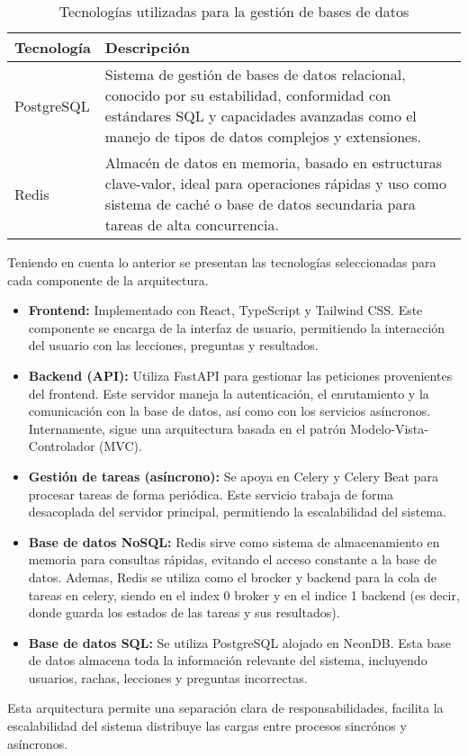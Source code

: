 \begin{table}[H]
\centering
\begin{tabular}{|p{3cm}|p{9cm}|}
\hline
\textbf{Tecnología} & \textbf{Descripción} \\
\hline
PostgreSQL & Sistema de gestión de bases de datos relacional, conocido por su estabilidad, conformidad con estándares SQL y capacidades avanzadas como el manejo de tipos de datos complejos y extensiones. \\
\hline
Redis & Almacén de datos en memoria, basado en estructuras clave-valor, ideal para operaciones rápidas y uso como sistema de caché o base de datos secundaria para tareas de alta concurrencia. \\
\hline
\end{tabular}
\caption{Tecnologías utilizadas para la gestión de bases de datos}
\end{table}


Teniendo en cuenta lo anterior se presentan las tecnologías seleccionadas para cada componente de la arquitectura.


\begin{itemize}
    \item \textbf{Frontend:} Implementado con React, TypeScript y Tailwind CSS. Este componente se encarga de la interfaz de usuario, permitiendo la interacci\'on del usuario con las lecciones, preguntas y resultados.
    
    \item \textbf{Backend (API):} Utiliza FastAPI para gestionar las peticiones provenientes del frontend. Este servidor maneja la autenticación, el enrutamiento y la comunicación con la base de datos, así como con los servicios asíncronos. Internamente, sigue una arquitectura basada en el patrón Modelo-Vista-Controlador (MVC).
    
    \item \textbf{Gestión de tareas (as\'incrono):} Se apoya en Celery y Celery Beat para procesar tareas de forma peri\'odica. Este servicio trabaja de forma desacoplada del servidor principal, permitiendo la escalabilidad del sistema.

    \item \textbf{Base de datos NoSQL:} Redis sirve como sistema de almacenamiento en memoria para consultas r\'apidas, evitando el acceso constante a la base de datos. Ademas, Redis se utiliza como el brocker y backend para la cola de tareas en celery, siendo en el index 0 broker y en el indice 1 backend (es decir, donde guarda los estados de las tareas y sus resultados).

    \item \textbf{Base de datos SQL:} Se utiliza PostgreSQL alojado en NeonDB. Esta base de datos almacena toda la informaci\'on relevante del sistema, incluyendo usuarios, rachas, lecciones y preguntas incorrectas.
\end{itemize}

\noindent Esta arquitectura permite una separaci\'on clara de responsabilidades, facilita la escalabilidad del sistema distribuye las cargas entre procesos sincr\'onos y as\'incronos.

